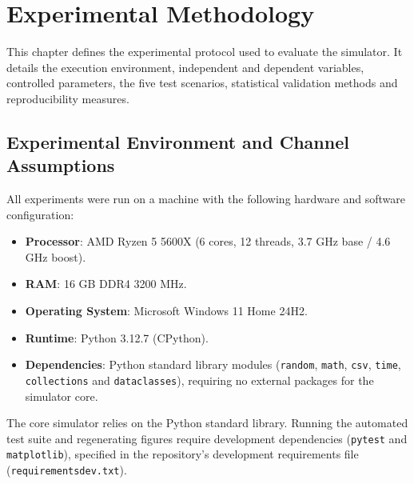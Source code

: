 \chapter{Experimental Methodology}
\label{chap:experimental_methodology}

This chapter defines the experimental protocol used to evaluate the simulator. It details the execution environment, independent and dependent variables, controlled parameters, the five test scenarios, statistical validation methods and reproducibility measures.

\section{Experimental Environment and Channel Assumptions}
\label{sec:experimental_environment}

All experiments were run on a machine with the following hardware and software configuration:

\begin{itemize}
    \item \textbf{Processor}: AMD Ryzen 5 5600X (6 cores, 12 threads, 3.7 GHz base / 4.6 GHz boost).
    \item \textbf{RAM}: 16 GB DDR4 3200 MHz.
    \item \textbf{Operating System}: Microsoft Windows 11 Home 24H2.
    \item \textbf{Runtime}: Python 3.12.7 (CPython).
    \item \textbf{Dependencies}: Python standard library modules (\texttt{random}, \texttt{math}, \texttt{csv}, \texttt{time}, \texttt{collections} and \texttt{dataclasses}), requiring no external packages for the simulator core.
\end{itemize}

The core simulator relies on the Python standard library. Running the automated test suite and regenerating figures require development dependencies (\texttt{pytest} and \texttt{matplotlib}), specified in the repository's development requirements file (\texttt{requirements\discretionary{-}{-}{-}dev.txt}).

